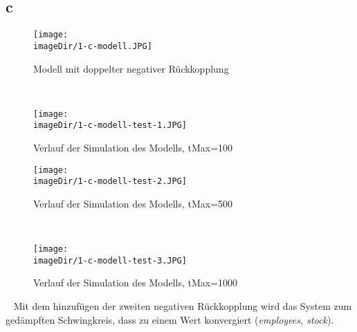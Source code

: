 \subsection{c}
\begin{figure}[h]
	\centering
	\texttt{[image: \\imageDir/1-c-modell.JPG]}
	\caption{Modell mit doppelter negativer Rückkopplung}
	\label{fig:1-c-modell}
\end{figure}
\ \newpage

\begin{figure}[h]
	\centering
	\texttt{[image: \\imageDir/1-c-modell-test-1.JPG]}
	\caption{Verlauf der Simulation des Modells, tMax=100}
	\label{fig:1-c-modell-test-1}
\end{figure}
\begin{figure}[h]
	\centering
	\texttt{[image: \\imageDir/1-c-modell-test-2.JPG]}
	\caption{Verlauf der Simulation des Modells, tMax=500}
	\label{fig:1-c-modell-test-2}
\end{figure}
\ \newpage

\begin{figure}[h]
\centering
\texttt{[image: \\imageDir/1-c-modell-test-3.JPG]}
\caption{Verlauf der Simulation des Modells, tMax=1000}
\label{fig:1-c-modell-test-3}
\end{figure}
\ \newline
Mit dem hinzufügen der zweiten negativen Rückkopplung wird das System zum gedämpften Schwingkreis, dass zu einem Wert konvergiert (\emph{employees, stock}).

